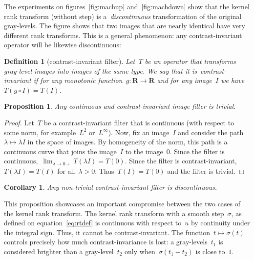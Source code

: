 \documentclass[12pt]{article}                  %
\newtheorem{definition}{Definition}
\newtheorem{proposition}{Proposition}
\newtheorem{corollary}{Corollary}
\begin{document}
The experiments on figures~\ref{fig:machup} and~\ref{fig:machdown} show that
the kernel rank transform (without step) is a~\emph{discontinuous}
transformation of the original gray-levels.  The figure shows that two
images that are nearly identical have very different rank transforms.  This
is a general phenomenon: any contrast-invariant operator will be likewise
discontinuous:

\begin{definition}[contrast-invariant filter]
	Let~$T$ be an operator that transforms gray-level images into images
	of the same type.  We say that it is~\emph{contrast-invariant} if
	for any
	monotonic function~$g:\mathbf{R}\to\mathbf{R}$ and for any image~$I$
	we have~$T(g\circ I)=T(I)$.
\end{definition}

\begin{proposition}
	Any continuous and contrast-invariant image filter is trivial.
\end{proposition}
\begin{proof}
	Let~$T$ be a contrast-invariant filter that is continuous (with
	respect to some norm, for example~$L^2$ or~$L^\infty$).
	Now, fix an image~$I$ and consider the
	path~$\lambda\mapsto \lambda I$ in the space of images.  By
	homogeneity of the norm, this path
	is a continuous curve that joins the image~$I$ to the image~$0$.
	Since the filter is continuous,~$\displaystyle\lim_{\lambda\to
	0+}T(\lambda I)=T(0)$.
	Since the filter is contrast-invariant,~$T(\lambda I)=T(I)$
	for all~$\lambda>0$.
	Thus~$T(I)=T(0)$ and the filter is trivial.
\end{proof}

\begin{corollary}
	Any non-trivial contrast-invariant filter is discontinuous.
\end{corollary}

This proposition showcases an important compromise between the two cases of
the kernel rank transform.
The kernel rank transform with a smooth step~$\sigma$, as defined on
equation~\ref{eq:rtdef} is continuous with respect to~$u$ by continuity
under the integral sign.  Thus, it cannot be contrast-invariant.  The
function~$t\mapsto\sigma(t)$ controls precisely how much contrast-invariance
is lost: a gray-levels~$t_1$ is considered brighter than a gray-level~$t_2$
only when~$\sigma(t_1-t_2)$ is close to~$1$.
\end{document}
